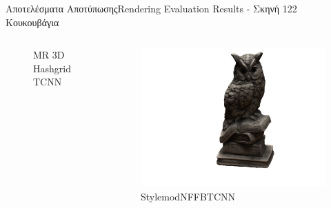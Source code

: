 \documentclass[10pt]{beamer}
\begin{document}
\begin{frame}{Αποτελέσματα Αποτύπωσης}{Rendering Evaluation Results - Σκηνή 122 Κουκουβάγια}
\begin{columns}[T]
\begin{figure}
                \caption{\tiny{MR 3D Hashgrid TCNN}}
            \end{figure}
            \begin{figure}
                \includegraphics[height=.3\textheight, width=\linewidth, keepaspectratio]{images/chapter5_img/RenderingResults/StylemodNFFBTCNN/eval_055.jpg}
                \caption{\tiny{StylemodNFFBTCNN}}
            \end{figure}
    \end{columns}
\end{frame}
\end{document}
